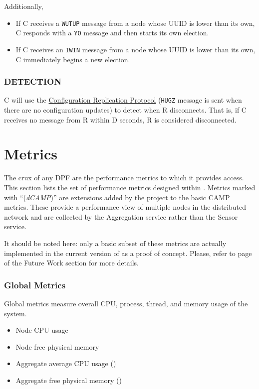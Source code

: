 Additionally,

\begin{itemize}
\item If C receives a \texttt{WUTUP} message from a node whose UUID is lower than its own, C responds with a \texttt{YO}
      message and then starts its own election.
\item If C receives an \texttt{IWIN} message from a node whose UUID is lower than its own, C immediately begins a new
      election.
\end{itemize}

\subsubsection{DETECTION}

C will use the \hyperref[proto_config]{Configuration Replication Protocol} (\texttt{HUGZ} message is sent when there are
no configuration updates) to detect when R disconnects. That is, if C receives no message from R within D seconds, R is
considered disconnected.

\section{\dcamp Metrics}
\label{dcamp_metrics}

The crux of any DPF are the performance metrics to which it provides access. This section lists the set of performance
metrics designed within \dcampns. Metrics marked with ``(\emph{dCAMP})'' are extensions added by the \dcamp project to the
basic CAMP metrics. These provide a performance view of multiple nodes in the distributed network and are collected by
the Aggregation service rather than the Sensor service.

It should be noted here: only a basic subset of these metrics are actually implemented in the current version of \dcamp
as a proof of concept. Please, refer to page \pageref{metric_extensions} of the Future Work section for more details.

\subsubsection{Global Metrics}
Global metrics measure overall CPU, process, thread, and memory usage of the system.
\begin{itemize}
\item Node CPU usage
\item Node free physical memory
\item Aggregate average CPU usage (\dcamp)
\item Aggregate free physical memory (\dcamp)
\end{itemize}

